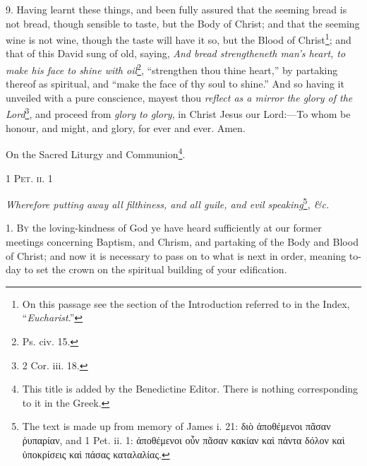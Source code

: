 9. Having learnt these things, and been fully assured that the seeming bread is not bread, though sensible to taste, but the Body of Christ; and that the seeming wine is not wine, though the taste will have it so, but the Blood of Christ\footnote{On this passage see the section of the Introduction referred to in the Index, “\emph{Eucharist}.”}; and that of this David sung of old, saying, \emph{And bread strengtheneth man’s heart, to make his face to shine with oil}\footnote{Ps. civ. 15.}, “strengthen thou thine heart,” by partaking thereof as spiritual, and “make the face of thy soul to shine.” And so having it unveiled with a pure conscience, mayest thou \emph{reflect as a mirror the glory of the Lord}\footnote{2 Cor. iii. 18.}, and proceed from \emph{glory to glory}, in Christ Jesus our Lord:—To whom be honour, and might, and glory, for ever and ever. Amen.


On the Sacred Liturgy and Communion\footnote{This title is added by the Benedictine Editor. There is nothing corresponding to it in the Greek.}.

\textsc{1 Pet. ii. 1}

\emph{Wherefore putting away all filthiness, and all guile, and evil speaking}\footnote{The text is made up from memory of James i. 21: \textgreek{διὸ ἀποθέμενοι πᾶσαν ῥυπαρίαν}, and 1 Pet. ii. 1: \textgreek{ἀποθέμενοι οὖν πᾶσαν κακίαν καὶ πάντα δόλον καὶ ὑποκρίσεις καὶ πάσας καταλαλίας}.}\emph{, \&c.}

1. \textsc{By} the loving-kindness of God ye have heard sufficiently at our former meetings concerning Baptism, and Chrism, and partaking of the Body and Blood of Christ; and now it is necessary to pass on to what is next in order, meaning to-day to set the crown on the spiritual building of your edification.

